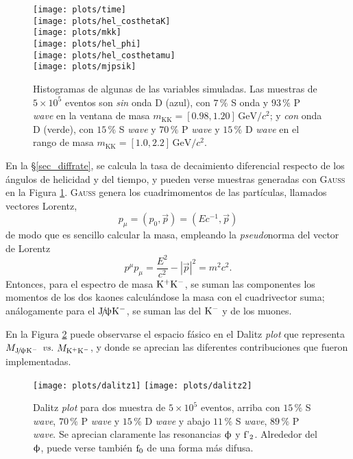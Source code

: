 \begin{figure}[H]
\begin{flushright}
\begin{multicols}{2}
\texttt{[image: plots/time]} \\
\texttt{[image: plots/hel\_costhetaK]} \\
\texttt{[image: plots/mkk]} \\
\texttt{[image: plots/hel\_phi]} \\
\texttt{[image: plots/hel\_costhetamu]} \\
\texttt{[image: plots/mjpsik]}
\end{multicols}
\end{flushright}
\caption{Histogramas de algunas de las variables simuladas. Las muestras de $5\times10^5$ eventos  son \emph{sin} onda D (azul), con $7\,\%$ S onda y $93\,\%$ P \emph{wave} en la ventana de masa $m_{\text{KK}} = [0.98,1.20]\,\mathrm{GeV}/c^2$; y \emph{con} onda D (verde), con $15\,\%$ S \emph{wave} y $70\,\%$ P \emph{wave} y $15\,\%$ D \emph{wave} en el rango de masa $m_{\text{KK}} = [1.0,2.2]\,\mathrm{GeV}/c^2$.}   \label{fig_evtgensamples1}
\end{figure}


En la \S \ref{sec_diffrate}, se calcula la tasa de decaimiento diferencial respecto de los ángulos de helicidad y del tiempo, y pueden verse muestras generadas con \textsc{Gauss} en la Figura \ref{fig_evtgensamples1}. \textsc{Gauss} genera los cuadrimomentos de las partículas, llamados vectores Lorentz, 
\[p_{\mu} = (p_0, \vec{p}) = (Ec^{-1},\vec{p})\]
de modo que es sencillo calcular la masa, empleando la \emph{pseudo}norma del vector de Lorentz
\[p^{\mu}p_{\mu} = \frac{E^2}{c^2} - |\vec{p}|^2 = m^2c^2. \]
Entonces, para el espectro de masa $\text{K}{}^{+}\text{K}{}^{-}$, se suman las componentes los momentos de los dos kaones calculándose la masa con el cuadrivector suma; análogamente para el $\text{J}\!/\!\uppsi\text{K}{}^{-}$, se suman las del $\text{K}{}^{-}$ y de los muones.

En la Figura \ref{fig_evtgensamples2} puede observarse el espacio fásico en el Dalitz \textit{plot} que representa $M_{\text{J}\!/\!\uppsi\text{K}{}^{-}}$ \emph{vs.} $M_{\text{K}{}^{+}\text{K}{}^{-}}$, y donde se aprecian las diferentes contribuciones que fueron implementadas.





\begin{figure}[H]
\centering
\texttt{[image: plots/dalitz1]}
\texttt{[image: plots/dalitz2]}
\caption{Dalitz \textit{plot} para dos muestra de $5\times 10^5$ eventos, arriba con $15\,\%$ S \emph{wave}, $70\,\%$ P \emph{wave} y $15\,\%$ D \emph{wave} y abajo $11\,\%$ S \emph{wave}, $89\,\%$ P \emph{wave}. Se aprecian claramente las resonancias $\upphi$ y $\text{f'}_2$. Alrededor del $\upphi$, puede verse también $\text{f}_0$ de una forma más difusa.}   \label{fig_evtgensamples2}
\end{figure}




